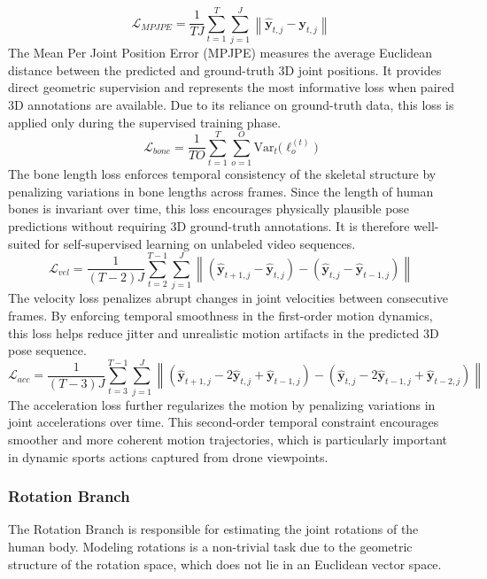 \begin{equation}
    \mathcal{L}_{MPJPE} = \frac{1}{TJ} \sum_{t=1}^{T} \sum_{j=1}^{J} \left\| \hat{\mathbf{y}}_{t,j} - \mathbf{y}_{t,j} \right\|
\end{equation}
The Mean Per Joint Position Error (MPJPE) measures the average Euclidean distance between the predicted and ground-truth 3D joint positions.
It provides direct geometric supervision and represents the most informative loss when paired 3D annotations are available.
Due to its reliance on ground-truth data, this loss is applied only during the supervised training phase.
\begin{equation}
    \mathcal{L}_{bone} = \frac{1}{TO} \sum_{t=1}^{T} \sum_{o=1}^{O} \text{Var}_{t} \bigl( \ell_{o}^{(t)} \bigr)
\end{equation}
The bone length loss enforces temporal consistency of the skeletal structure by penalizing variations in bone lengths across frames.
Since the length of human bones is invariant over time, this loss encourages physically plausible pose predictions without requiring 3D ground-truth annotations.
It is therefore well-suited for self-supervised learning on unlabeled video sequences.
\begin{equation}
    \mathcal{L}_{vel} = \frac{1}{(T-2)J} \sum_{t=2}^{T-1} \sum_{j=1}^{J} \left\| (\hat{\mathbf{y}}_{t+1,j} - \hat{\mathbf{y}}_{t,j}) - (\hat{\mathbf{y}}_{t,j} - \hat{\mathbf{y}}_{t-1,j}) \right\|
\end{equation}
The velocity loss penalizes abrupt changes in joint velocities between consecutive frames.
By enforcing temporal smoothness in the first-order motion dynamics, this loss helps reduce jitter and unrealistic motion artifacts in the predicted 3D pose sequence.
\begin{equation}
    \mathcal{L}_{acc} = \frac{1}{(T-3)J} \sum_{t=3}^{T-1} \sum_{j=1}^{J} \left\| (\hat{\mathbf{y}}_{t+1,j} - 2\hat{\mathbf{y}}_{t,j} + \hat{\mathbf{y}}_{t-1,j}) - (\hat{\mathbf{y}}_{t,j} - 2\hat{\mathbf{y}}_{t-1,j} + \hat{\mathbf{y}}_{t-2,j}) \right\|
\end{equation}
The acceleration loss further regularizes the motion by penalizing variations in joint accelerations over time.
This second-order temporal constraint encourages smoother and more coherent motion trajectories, which is particularly important in dynamic sports actions captured from drone viewpoints.


\subsubsection{Rotation Branch}
The Rotation Branch is responsible for estimating the joint rotations of the human body. 
Modeling rotations is a non-trivial task due to the geometric structure of the rotation space, which does not lie in an Euclidean vector space.

